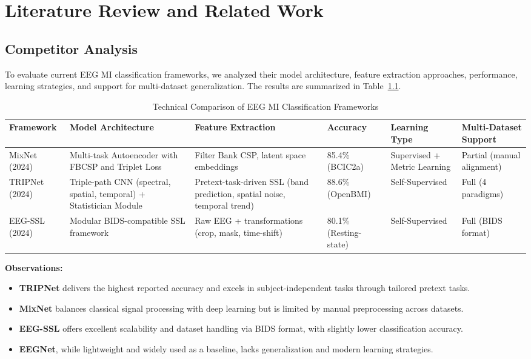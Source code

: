 \chapter{Literature Review and Related Work}
\label{ch:relatedworks}

\section{Competitor Analysis}
\label{sec:competitor-analysis}

To evaluate current EEG MI classification frameworks, we analyzed their model architecture, feature extraction approaches, performance, learning strategies, and support for multi-dataset generalization. The results are summarized in Table~\ref{tab:competitor-comparison}.

\begin{table}[H]
    \centering
    \caption{Technical Comparison of EEG MI Classification Frameworks}
    \label{tab:competitor-comparison}
    \small
    \begin{tabularx}{\textwidth}{|p{2cm}|p{2.2cm}|p{2.2cm}|p{1.7cm}|p{2cm}|p{2cm}|}
        \hline
        \textbf{Framework} & \textbf{Model Architecture} & \textbf{Feature Extraction} & \textbf{Accuracy} & \textbf{Learning Type} & \textbf{Multi-Dataset Support} \\
        \hline
        MixNet (2024) & Multi-task Autoencoder with FBCSP and Triplet Loss & Filter Bank CSP, latent space embeddings & 85.4\% (BCIC2a) & Supervised + Metric Learning & Partial (manual alignment) \\
        \hline
        TRIPNet (2024) & Triple-path CNN (spectral, spatial, temporal) + Statistician Module & Pretext-task-driven SSL (band prediction, spatial noise, temporal trend) & 88.6\% (OpenBMI) & Self-Supervised & Full (4 paradigms) \\
        \hline
        EEG-SSL (2024) & Modular BIDS-compatible SSL framework & Raw EEG + transformations (crop, mask, time-shift) & 80.1\% (Resting-state) & Self-Supervised & Full (BIDS format) \\
        \hline
    \end{tabularx}
\end{table}
\noindent
\textbf{Observations:}
\begin{itemize}
    \item \textbf{TRIPNet} delivers the highest reported accuracy and excels in subject-independent tasks through tailored pretext tasks.
    \item \textbf{MixNet} balances classical signal processing with deep learning but is limited by manual preprocessing across datasets.
    \item \textbf{EEG-SSL} offers excellent scalability and dataset handling via BIDS format, with slightly lower classification accuracy.
    \item \textbf{EEGNet}, while lightweight and widely used as a baseline, lacks generalization and modern learning strategies.
\end{itemize}

